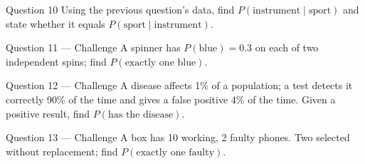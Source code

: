 \documentclass[11pt]{article}
\begin{document}
\begin{qbox}{Question 10}
Using the previous question's data, find $P(\text{instrument}\mid\text{sport})$ and state whether it equals $P(\text{sport}\mid\text{instrument})$.\workspace{2.4cm}
\end{qbox}

\begin{qbox}{Question 11 --- Challenge}
A spinner has $P(\text{blue})=0.3$ on each of two independent spins; find $P(\text{exactly one blue})$.\workspace{3cm}
\end{qbox}

\begin{qbox}{Question 12 --- Challenge}
A disease affects 1\% of a population; a test detects it correctly 90\% of the time and gives a false positive 4\% of the time. Given a positive result, find $P(\text{has the disease})$.\workspace{3.4cm}
\end{qbox}

\begin{qbox}{Question 13 --- Challenge}
A box has 10 working, 2 faulty phones. Two selected without replacement; find $P(\text{exactly one faulty})$.\workspace{3.2cm}
\end{qbox}

\clearpage
{}
\end{document}
